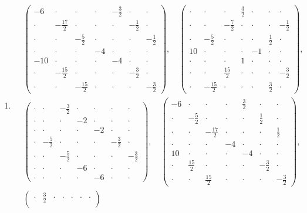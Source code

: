 \documentclass[a4paper,10pt,leqno]{article}
\numberwithin{equation}{section}
\theoremstyle{plain}
\theoremstyle{definition}
\theoremstyle{remark}
\newcommand{\mat}[1]{\begin{matrix}#1\end{matrix}}
\newcommand{\pmat}[1]{\left(\mat{#1}\right)}
\begin{document}
\begin{enumerate}
\item[$\ell = 3$:]
\begin{align}
&\pmat{-6&\cdot&\cdot&\cdot&-\frac32&\cdot&\cdot\\
		\cdot&-\frac{17}{2}&\cdot&\cdot&\cdot&-\frac12&\cdot\\
		\cdot&\cdot&-\frac52&\cdot&\cdot&\cdot&-\frac12\\
		\cdot&\cdot&\cdot&-4&\cdot&\cdot&\cdot\\
		-10&\cdot&\cdot&\cdot&-4&\cdot&\cdot\\
		\cdot&-\frac{15}{2}&\cdot&\cdot&\cdot&-\frac32&\cdot\\
		\cdot&\cdot&-\frac{15}{2}&\cdot&\cdot&\cdot&-\frac32},\quad 
	\pmat{\cdot&\cdot&\cdot&\frac32&\cdot&\cdot&\cdot\\
		\cdot&\cdot&-\frac72&\cdot&\cdot&\cdot&-\frac12\\
		\cdot&-\frac52&\cdot&\cdot&\cdot&\frac12&\cdot\\
		10&\cdot&\cdot&\cdot&-1&\cdot&\cdot\\
		\cdot&\cdot&\cdot&1&\cdot&\cdot&\cdot\\
		\cdot&\cdot&\frac{15}{2}&\cdot&\cdot&\cdot&-\frac32\\
		\cdot&-\frac{15}{2}&\cdot&\cdot&\cdot&\frac32&\cdot},\\[0.5ex]
&\pmat{\cdot&\cdot&-\frac32&\cdot&\cdot&\cdot&\cdot\\
		\cdot&\cdot&\cdot&-2&\cdot&\cdot&\cdot\\
		\cdot&\cdot&\cdot&\cdot&-2&\cdot&\cdot\\
		\cdot&-\frac52&\cdot&\cdot&\cdot&-\frac32&\cdot\\
		\cdot&\cdot&-\frac52&\cdot&\cdot&\cdot&-\frac32\\
		\cdot&\cdot&\cdot&-6&\cdot&\cdot&\cdot\\
		\cdot&\cdot&\cdot&\cdot&-6&\cdot&\cdot},\quad
	\pmat{-6&\cdot&\cdot&\cdot&\frac32&\cdot&\cdot\\
		\cdot&-\frac52&\cdot&\cdot&\cdot&\frac12&\cdot\\
		\cdot&\cdot&-\frac{17}{2}&\cdot&\cdot&\cdot&\frac12\\
		\cdot&\cdot&\cdot&-4&\cdot&\cdot&\cdot\\
		10&\cdot&\cdot&\cdot&-4&\cdot&\cdot\\
		\cdot&\frac{15}{2}&\cdot&\cdot&\cdot&-\frac32&\cdot\\
		\cdot&\cdot&\frac{15}{2}&\cdot&\cdot&\cdot&-\frac32},\\[0.5ex]
&\pmat{\cdot&\frac32&\cdot&\cdot&\cdot&\cdot&\cdot\\
}
\end{align}
\end{enumerate}
\end{document}
